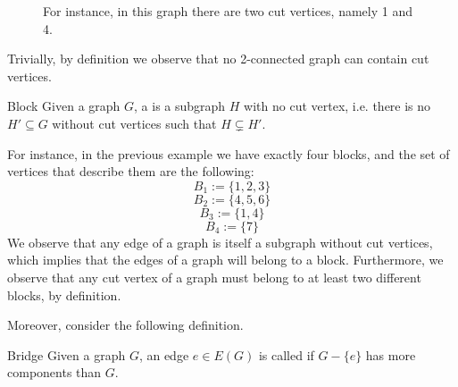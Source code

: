 \documentclass[a4paper, 12pt]{report}
\begin{document}
    \begin{figure}[H]
        \centering
        \caption{For instance, in this graph there are two cut vertices, namely 1 and 4.}
    \end{figure}

    Trivially, by definition we observe that no 2-connected graph can contain cut vertices.

    \begin{frameddefn}{Block}
        Given a graph $G$, a  is a  subgraph $H$ with no cut vertex, i.e. there is no $H' \subseteq G$ without cut vertices such that $H \subsetneq H'$.
    \end{frameddefn}

    For instance, in the previous example we have exactly four blocks, and the set of vertices that describe them are the following: $$B_1 := \{1, 2, 3\}$$ $$B_2 := \{4, 5, 6\}$$ $$B_3 := \{1, 4\}$$ $$B_4 := \{7\}$$ We observe that any edge of a graph is itself a subgraph without cut vertices, which implies that  the edges of a graph will belong to a block. Furthermore, we observe that any cut vertex of a graph must belong to at least two different blocks, by definition.

    Moreover, consider the following definition.

    \begin{frameddefn}{Bridge}
        Given a graph $G$, an edge $e \in E(G)$ is called  if $G - \{e\}$ has more components than $G$.
    \end{frameddefn}
\end{document}
